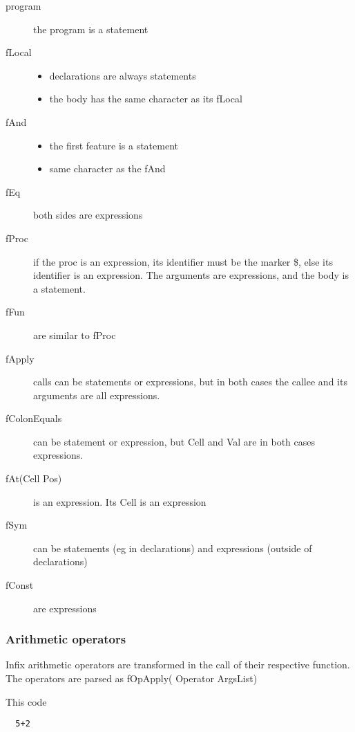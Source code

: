 \documentclass[a4paper]{memoir}
\begin{document}
\begin{description}
  \item[program] the program is a statement
  \item[fLocal] 
    \begin{itemize}
      \item declarations are always statements
      \item the body has the same character as its fLocal
    \end{itemize}
  \item[fAnd] 
    \begin{itemize}
      \item the first feature is a statement
      \item same character as the fAnd
    \end{itemize}
  \item[fEq] both sides are expressions
  \item[fProc] if the proc is an expression, its identifier must be the marker \$, else its identifier is an expression. The arguments are expressions, and the body is a statement.
  \item[fFun] are similar to fProc
  \item[fApply] calls can be statements or expressions, but in both cases the callee and its arguments are all expressions. 
  \item[fColonEquals] can be statement or expression, but Cell and Val are in both cases expressions.
  \item[fAt(Cell Pos)] is an expression. Its Cell is an expression
  \item[fSym] can be statements (eg in declarations) and expressions (outside of declarations)
  \item[fConst] are expressions
\end{description}



\subsubsection{Arithmetic operators}
Infix arithmetic operators are transformed in the call of their respective function.
The operators are parsed as fOpApply( Operator ArgsList)

This code

\begin{lstlisting}
  5+2
\end{lstlisting}
\end{document}
